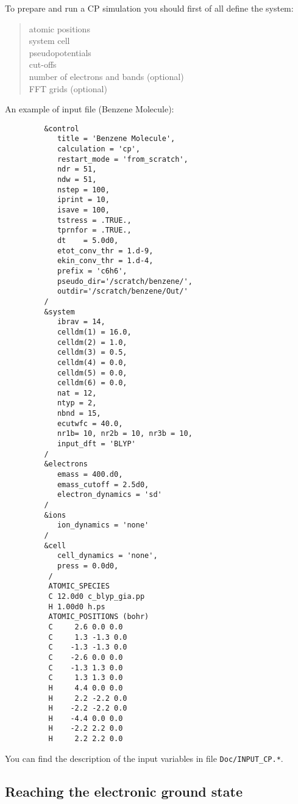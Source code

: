 \documentclass[12pt,a4paper]{article}
\begin{document}
To prepare and run a CP simulation you should first of all
define the system:
  \begin{quote}
    atomic positions\\
    system cell\\
    pseudopotentials\\
    cut-offs\\
    number of electrons and bands (optional)\\
    FFT grids (optional)
  \end{quote}
An example of input file (Benzene Molecule):
\begin{verbatim}
         &control
            title = 'Benzene Molecule',
            calculation = 'cp',
            restart_mode = 'from_scratch',
            ndr = 51,
            ndw = 51,
            nstep = 100,
            iprint = 10,
            isave = 100,
            tstress = .TRUE.,
            tprnfor = .TRUE.,
            dt    = 5.0d0,
            etot_conv_thr = 1.d-9,
            ekin_conv_thr = 1.d-4,
            prefix = 'c6h6',
            pseudo_dir='/scratch/benzene/',
            outdir='/scratch/benzene/Out/'
         /
         &system
            ibrav = 14,
            celldm(1) = 16.0,
            celldm(2) = 1.0,
            celldm(3) = 0.5,
            celldm(4) = 0.0,
            celldm(5) = 0.0,
            celldm(6) = 0.0,
            nat = 12,
            ntyp = 2,
            nbnd = 15,
            ecutwfc = 40.0,
            nr1b= 10, nr2b = 10, nr3b = 10,
            input_dft = 'BLYP'
         /
         &electrons
            emass = 400.d0,
            emass_cutoff = 2.5d0,
            electron_dynamics = 'sd'
         /
         &ions
            ion_dynamics = 'none'
         /
         &cell
            cell_dynamics = 'none',
            press = 0.0d0,
          /
          ATOMIC_SPECIES
          C 12.0d0 c_blyp_gia.pp
          H 1.00d0 h.ps
          ATOMIC_POSITIONS (bohr)
          C     2.6 0.0 0.0
          C     1.3 -1.3 0.0
          C    -1.3 -1.3 0.0
          C    -2.6 0.0 0.0
          C    -1.3 1.3 0.0
          C     1.3 1.3 0.0
          H     4.4 0.0 0.0
          H     2.2 -2.2 0.0
          H    -2.2 -2.2 0.0
          H    -4.4 0.0 0.0
          H    -2.2 2.2 0.0
          H     2.2 2.2 0.0
\end{verbatim} 
You can find the description of the input variables in file 
\texttt{Doc/INPUT\_CP.*}.

\subsection{Reaching the electronic ground state}
\end{document}
